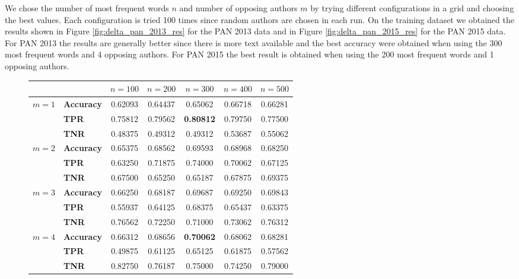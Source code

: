We chose the number of most frequent words $n$ and number of opposing
authors $m$ by trying different configurations in a grid and choosing the
best values. Each configuration is tried 100 times since random authors are
chosen in each run. On the training dataset we obtained the results shown in
Figure \ref{fig:delta_pan_2013_res} for the PAN 2013 data and in Figure
\ref{fig:delta_pan_2015_res} for the PAN 2015 data. For PAN 2013 the results are
generally better since there is more text available and the best accuracy were
obtained when using the 300 most frequent words and 4 opposing authors. For PAN
2015 the best result is obtained when using the 200 most frequent words and 1
opposing authors.

\begin{figure}
    \centering
    \begin{tabular}{c|lccccc}
               &                   & $n=100$ & $n=200$ & $n=300$ & $n=400$ & $n=500$ \\
        \hline
        $m=1$  & \textbf{Accuracy} & 0.62093 & 0.64437 & 0.65062 & 0.66718 & 0.66281 \\
               & \textbf{TPR}      & 0.75812 & 0.79562 & \textbf{0.80812} & 0.79750 & 0.77500 \\
               & \textbf{TNR}      & 0.48375 & 0.49312 & 0.49312 & 0.53687 & 0.55062 \\
        \hline
        $m=2$  & \textbf{Accuracy} & 0.65375 & 0.68562 & 0.69593 & 0.68968 & 0.68250 \\
               & \textbf{TPR}      & 0.63250 & 0.71875 & 0.74000 & 0.70062 & 0.67125 \\
               & \textbf{TNR}      & 0.67500 & 0.65250 & 0.65187 & 0.67875 & 0.69375 \\
        \hline
        $m=3$  & \textbf{Accuracy} & 0.66250 & 0.68187 & 0.69687 & 0.69250 & 0.69843 \\
               & \textbf{TPR}      & 0.55937 & 0.64125 & 0.68375 & 0.65437 & 0.63375 \\
               & \textbf{TNR}      & 0.76562 & 0.72250 & 0.71000 & 0.73062 & 0.76312 \\
        \hline
        $m=4$  & \textbf{Accuracy} & 0.66312 & 0.68656 & \textbf{0.70062} & 0.68062 & 0.68281 \\
               & \textbf{TPR}      & 0.49875 & 0.61125 & 0.65125 & 0.61875 & 0.57562 \\
               & \textbf{TNR}      & 0.82750 & 0.76187 & 0.75000 & 0.74250 & 0.79000 \\

\end{tabular}
\end{figure}
